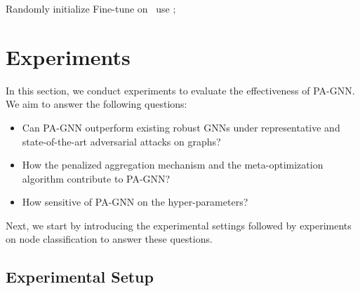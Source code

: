\documentclass[sigconf]{acmart}
\newcommand{\our}{{PA-GNN}\xspace}
\newcommand{\ours}{{PA-GNN}\xspace}
\begin{document}
\begin{algorithm}
	\caption{The training framework of \ours}
    \label{alg}
	Randomly initialize \;
	Fine-tune  on \ use ;
\end{algorithm} \section{Experiments}
In this section, we conduct experiments to evaluate the effectiveness of \our. We aim to answer the following questions:
\begin{itemize}[leftmargin=*]
    \item Can \our outperform existing robust GNNs under representative and state-of-the-art adversarial attacks on graphs?
    \item How the penalized aggregation mechanism and the meta-optimization algorithm contribute to \our?
    \item How sensitive of \our on the hyper-parameters?
\end{itemize}
Next, we start by introducing the experimental settings followed by experiments on node classification to answer these questions.

\subsection{Experimental Setup}
\end{document}
